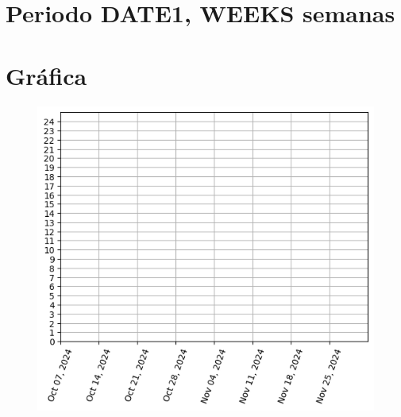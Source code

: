  
\section*{Periodo DATE1, WEEKS semanas }

\newpage

\section*{Gráfica}

\begin{figure}[H]
\centering
\includegraphics[scale=1]{graph.png}
\end{figure}

  \newpage
  $\;$
  \newpage
